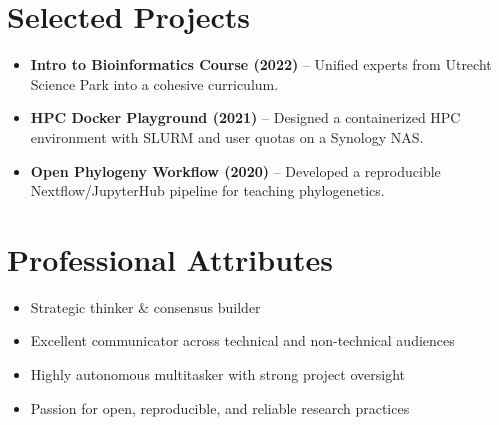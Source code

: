 \documentclass[a4paper,10pt]{article}
\begin{document}
\section*{Selected Projects}
\begin{itemize}
  \item \textbf{Intro to Bioinformatics Course (2022)} – Unified experts from Utrecht Science Park into a cohesive curriculum. 
  \item \textbf{HPC Docker Playground (2021)} – Designed a containerized HPC environment with SLURM and user quotas on a Synology NAS.
  \item \textbf{Open Phylogeny Workflow (2020)} – Developed a reproducible Nextflow/JupyterHub pipeline for teaching phylogenetics. 
\end{itemize}

\section*{Professional Attributes}
\begin{itemize}
  \item Strategic thinker \& consensus builder
  \item Excellent communicator across technical and non-technical audiences
  \item Highly autonomous multitasker with strong project oversight
  \item Passion for open, reproducible, and reliable research practices
\end{itemize}

\end{document}
